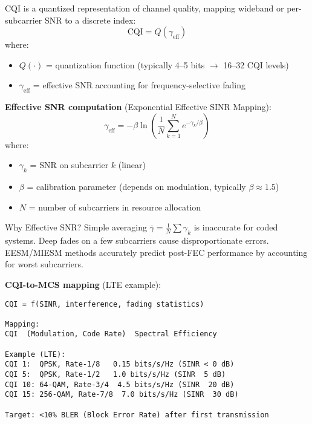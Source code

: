 CQI is a quantized representation of channel quality, mapping wideband or per-subcarrier SNR to a discrete index:
\begin{equation}
\text{CQI} = Q(\gamma_{\text{eff}})
\end{equation}
where:
\begin{itemize}
\item $Q(\cdot)$ = quantization function (typically 4--5 bits $\rightarrow$ 16--32 CQI levels)
\item $\gamma_{\text{eff}}$ = effective SNR accounting for frequency-selective fading
\end{itemize}

\textbf{Effective SNR computation} (Exponential Effective SINR Mapping):
\begin{equation}
\gamma_{\text{eff}} = -\beta \ln\left(\frac{1}{N}\sum_{k=1}^{N} e^{-\gamma_k/\beta}\right)
\end{equation}
where:
\begin{itemize}
\item $\gamma_k$ = SNR on subcarrier $k$ (linear)
\item $\beta$ = calibration parameter (depends on modulation, typically $\beta \approx 1.5$)
\item $N$ = number of subcarriers in resource allocation
\end{itemize}

\begin{calloutbox}{Why Effective SNR?}
Simple averaging $\bar{\gamma} = \frac{1}{N}\sum \gamma_k$ is inaccurate for coded systems. Deep fades on a few subcarriers cause disproportionate errors. EESM/MIESM methods accurately predict post-FEC performance by accounting for worst subcarriers.
\end{calloutbox}

\textbf{CQI-to-MCS mapping} (LTE example):

\begin{verbatim}
CQI = f(SINR, interference, fading statistics)

Mapping:
CQI  (Modulation, Code Rate)  Spectral Efficiency

Example (LTE):
CQI 1:  QPSK, Rate-1/8   0.15 bits/s/Hz (SINR < 0 dB)
CQI 5:  QPSK, Rate-1/2   1.0 bits/s/Hz (SINR  5 dB)
CQI 10: 64-QAM, Rate-3/4  4.5 bits/s/Hz (SINR  20 dB)
CQI 15: 256-QAM, Rate-7/8  7.0 bits/s/Hz (SINR  30 dB)

Target: <10% BLER (Block Error Rate) after first transmission
\end{verbatim}

